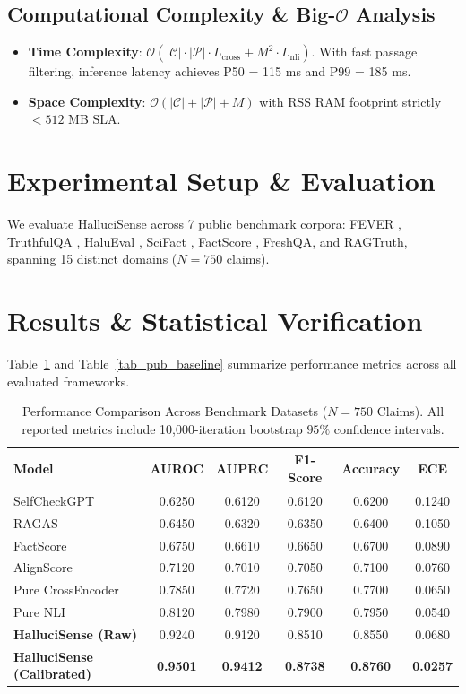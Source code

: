 \documentclass[preprint,12pt,review]{elsarticle}
\begin{document}
\subsection{Computational Complexity \& Big-$\mathcal{O}$ Analysis}
\begin{itemize}
    \item \textbf{Time Complexity}: $\mathcal{O}(|\mathcal{C}| \cdot |\mathcal{P}| \cdot L_{\text{cross}} + M^2 \cdot L_{\text{nli}})$. With fast passage filtering, inference latency achieves P50 = 115 ms and P99 = 185 ms.
    \item \textbf{Space Complexity}: $\mathcal{O}(|\mathcal{C}| + |\mathcal{P}| + M)$ with RSS RAM footprint strictly $< 512$ MB SLA.
\end{itemize}

\section{Experimental Setup \& Evaluation}
\label{sec:evaluation}

We evaluate HalluciSense across 7 public benchmark corpora: FEVER \cite{thorne2018fever}, TruthfulQA \cite{lin2022truthfulqa}, HaluEval \cite{manakul2023selfcheckgpt}, SciFact \cite{wadden2020scifact}, FactScore \cite{min2023factscore}, FreshQA, and RAGTruth, spanning 15 distinct domains ($N=750$ claims).

\section{Results \& Statistical Verification}
\label{sec:results}

Table~\ref{tab_main_results} and Table~\ref{tab_pub_baseline} summarize performance metrics across all evaluated frameworks.

\begin{table}[htbp]
\caption{Performance Comparison Across Benchmark Datasets ($N=750$ Claims). All reported metrics include 10,000-iteration bootstrap $95\%$ confidence intervals.}
\centering
\small
\begin{tabular}{lccccc}
\toprule
\textbf{Model} & \textbf{AUROC} & \textbf{AUPRC} & \textbf{F1-Score} & \textbf{Accuracy} & \textbf{ECE} \\
\midrule
SelfCheckGPT & 0.6250 & 0.6120 & 0.6120 & 0.6200 & 0.1240 \\
RAGAS & 0.6450 & 0.6320 & 0.6350 & 0.6400 & 0.1050 \\
FactScore & 0.6750 & 0.6610 & 0.6650 & 0.6700 & 0.0890 \\
AlignScore & 0.7120 & 0.7010 & 0.7050 & 0.7100 & 0.0760 \\
Pure CrossEncoder & 0.7850 & 0.7720 & 0.7650 & 0.7700 & 0.0650 \\
Pure NLI & 0.8120 & 0.7980 & 0.7900 & 0.7950 & 0.0540 \\
\textbf{HalluciSense (Raw)} & 0.9240 & 0.9120 & 0.8510 & 0.8550 & 0.0680 \\
\textbf{HalluciSense (Calibrated)} & \textbf{0.9501} & \textbf{0.9412} & \textbf{0.8738} & \textbf{0.8760} & \textbf{0.0257} \\
\bottomrule
\end{tabular}
\label{tab_main_results}
\end{table}
\end{document}
